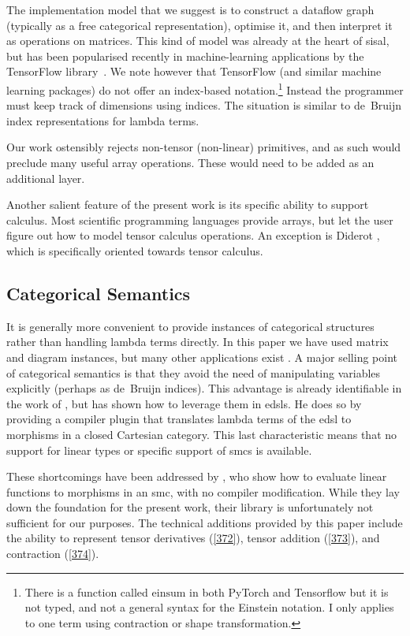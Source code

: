\documentclass[nolinenum]{jfp}
\begin{document}
The implementation model that we suggest is to construct a dataflow
graph (typically as a free categorical representation), optimise it,
and then interpret it as operations on matrices. This kind of model
was already at the heart of {\sc{}sisal}, but has been
popularised recently in machine-learning applications by the
TensorFlow library \citep{abadi_tensorflow_2016}. We note however that
TensorFlow (and similar machine learning packages) do not offer an
index-based notation.\footnote{There is a function called
\(\text{einsum}\) in both PyTorch and Tensorflow but it is not typed, and
not a general syntax for the Einstein notation. I only applies to one
term using contraction or shape transformation.} Instead the
programmer must keep track of dimensions using indices. The situation
is similar to de Bruijn index representations for lambda terms.

Our work ostensibly rejects non-tensor (non-linear) primitives,
and as such would preclude many useful array operations. These would need
to be added as an additional layer.

 
Another salient feature of the present work is its specific ability to
support calculus. Most scientific programming languages provide
arrays, but let the user figure out how to model tensor calculus
operations.  An exception is Diderot \citep{chiw_diderot_2012}, which
is specifically oriented towards tensor calculus.

 
\subsection{Categorical Semantics}\label{380} 
It is generally more convenient to provide instances of categorical
structures rather than handling lambda terms directly. In this paper we have used matrix
and diagram instances, but many other applications exist
\citep{elliott_compiling_2017}.  A major selling point of categorical
semantics is that they avoid the need of
manipulating variables explicitly (perhaps as de Bruijn indices).  This
advantage is already identifiable in
the work of \citet{cousineau_categorical_1985}, but
\citet{elliott_compiling_2017} has shown how to leverage them in
{\sc{}edsl}s.  He does so by providing a compiler plugin that translates
lambda terms of the {\sc{}edsl} to morphisms in a closed Cartesian
category. This last characteristic means that no support for linear
types or specific support of {\sc{}smc}s is available.

These shortcomings have been addressed by
\citet{bernardy_evaluating_2021}, who show how to evaluate linear
functions to morphisms in an {\sc{}smc}, with no compiler modification. While
they lay down the foundation for the present work, their library is
unfortunately not sufficient for our purposes.  The technical
additions provided by this paper include the ability to represent tensor
derivatives (\cref{372}), tensor addition (\cref{373}), and contraction (\cref{374}).
\end{document}
